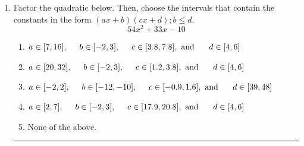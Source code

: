 \documentclass[14pt]{extbook}
\newcommand{\litem}[1]{\item#1\hspace*{-1cm}\rule{\textwidth}{0.4pt}}
\begin{document}
\begin{enumerate}
{\begin{enumerate}[label=\Alph*.]
\end{enumerate} }
\litem{
Factor the quadratic below. Then, choose the intervals that contain the constants in the form $(ax+b)(cx+d); b \leq d.$\[ 54x^{2} +33 x -10 \]\begin{enumerate}[label=\Alph*.]
\item \( a \in [7, 16], \hspace*{5mm} b \in [-2, 3], \hspace*{5mm} c \in [3.8, 7.8], \text{ and } \hspace*{5mm} d \in [4, 6] \)
\item \( a \in [20, 32], \hspace*{5mm} b \in [-2, 3], \hspace*{5mm} c \in [1.2, 3.8], \text{ and } \hspace*{5mm} d \in [4, 6] \)
\item \( a \in [-2, 2], \hspace*{5mm} b \in [-12, -10], \hspace*{5mm} c \in [-0.9, 1.6], \text{ and } \hspace*{5mm} d \in [39, 48] \)
\item \( a \in [2, 7], \hspace*{5mm} b \in [-2, 3], \hspace*{5mm} c \in [17.9, 20.8], \text{ and } \hspace*{5mm} d \in [4, 6] \)
\item \( \text{None of the above.} \)


\end{enumerate}}
\end{enumerate}
\end{document}
